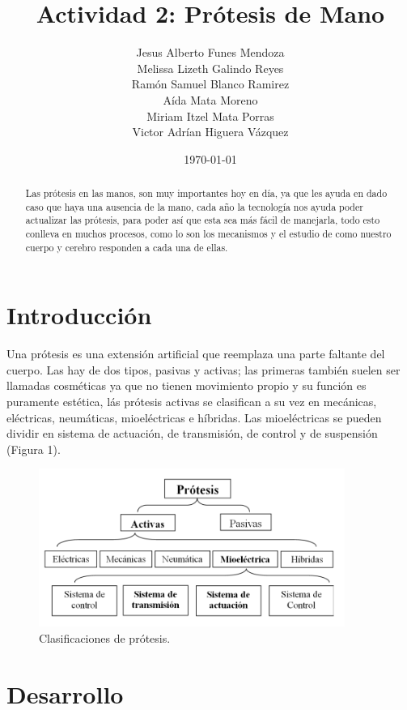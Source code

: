 \documentclass{article}
\author{Jesus Alberto Funes Mendoza  \\
Melissa Lizeth Galindo Reyes  \\
Ramón Samuel Blanco Ramirez  \\
Aída Mata Moreno  \\
Miriam Itzel Mata Porras  \\ 
Victor Adrían Higuera Vázquez} %
\title{Actividad 2: Prótesis de Mano} %
\date{\today}
\begin{document}

\maketitle %

\begin{abstract} %
Las prótesis en las manos, son muy importantes hoy en día, ya que les ayuda en dado caso que haya una ausencia de la mano, cada año la tecnología nos ayuda poder actualizar las prótesis, para poder así que esta sea más fácil de manejarla, todo esto conlleva en muchos procesos, como lo son los mecanismos y el estudio de como nuestro cuerpo y cerebro responden a cada una de ellas. 
\end{abstract}

\section{Introducción}\label{intro} %

 
Una prótesis es una extensión artificial que reemplaza una parte faltante del cuerpo. Las hay de dos tipos, pasivas y activas; las primeras también suelen ser llamadas cosméticas ya que no tienen movimiento propio y su función es puramente estética, lás prótesis activas se clasifican a su vez en mecánicas, eléctricas, neumáticas, mioeléctricas e híbridas. Las mioeléctricas se pueden dividir en sistema de actuación, de transmisión, de control y de suspensión (Figura 1)\cite{ff2}. 

\begin{figure}[H] %
    \centering
    \includegraphics[width=100mm]{Clasificaciones.png} %
    \caption{Clasificaciones de prótesis\cite{ff2}.}
    \label{grafica}
\end{figure}


\section{Desarrollo}
\end{document}
